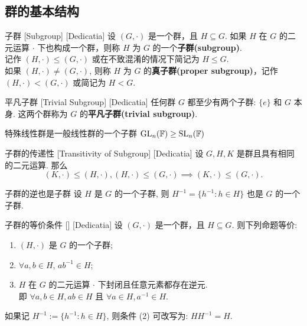     \subsection{群的基本结构}

        \begin{dfn}
            [Subgroup]
            {子群}
            [Subgroup]
            [Dedicatia]
            设 \((G,\cdot)\) 是一个群，且 \(H\subseteq G\). 如果 \(H\) 在 \(G\) 的二元运算 \(\cdot\) 下也构成一个群，则称 \(H\) 为 \(G\) 的一个\textbf{子群(subgroup)}.\\
            记作 \((H,\cdot)\leq(G,\cdot)\) 或在不致混淆的情况下简记为 \(H\leq G\).\\
            如果 \((H,\cdot)\neq(G,\cdot)\), 则称 \(H\) 为 \(G\) 的\textbf{真子群(proper subgroup)}，记作 \((H,\cdot)<(G,\cdot)\) 或简记为 \(H<G\).
        \end{dfn}

        \begin{ppt}
            {平凡子群}
            [Trivial Subgroup]
            [Dedicatia]
            任何群 \(G\) 都至少有两个子群: \(\{e\}\) 和 \(G\) 本身. 这两个群称为 \(G\) 的\textbf{平凡子群(trivial subgroup)}.
        \end{ppt}

        \begin{ins}
            {特殊线性群是一般线性群的一个子群}
            \(\operatorname{GL}_n(\operatorname{\mathbb{F}})\geq\operatorname{SL}_n(\operatorname{\mathbb{F}})\)
        \end{ins}

        \begin{ppt}
            [SubgroupTransitivity]
            {子群的传递性}
            [Transitivity of Subgroup]
            [Dedicatia]
            设 \(G,H,K\) 是群且具有相同的二元运算. 那么
            \[(K,\cdot)\leq(H,\cdot), (H,\cdot)\leq(G,\cdot)\implies (K,\cdot)\leq(G,\cdot).\]
        \end{ppt}

        \begin{ppt}
            {子群的逆也是子群}
            设 \(H\) 是 \(G\) 的一个子群, 则 \(H^{-1}=\{h^{-1}:h\in H\}\) 也是 \(G\) 的一个子群.
        \end{ppt}

        \begin{ppt}
            {子群的等价条件}
            []
            [Dedicatia]
            设 \((G,\cdot)\) 是一个群，且 \(H\subseteq G\). 则下列命题等价:
            \begin{enumerate}
                \item \((H,\cdot)\) 是 \(G\) 的一个子群;
                \item \(\forall a,b\in H\), \(ab^{-1}\in H\);
                \item \(H\) 在 \(G\) 的二元运算 \(\cdot\) 下封闭且任意元素都存在逆元. \\ 即 \(\forall a,b\in H, ab\in H\) 且 \(\forall a\in H, a^{-1}\in H\).
            \end{enumerate}
            如果记 \(H^{-1}:=\{h^{-1}:h\in H\}\), 则条件 (2) 可改写为: \(HH^{-1}=H\).
        \end{ppt}


